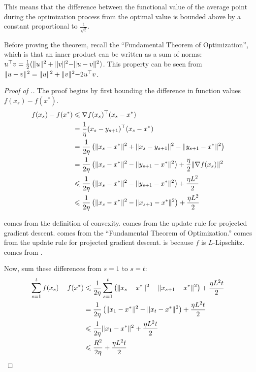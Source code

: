 This means that the difference between the functional value of the average
point during the optimization process from the optimal value is bounded above
by a constant proportional to $\frac{1}{\sqrt{t}}$.

Before proving the theorem, recall the ``Fundamental Theorem of Optimization'',
which is that an inner product can be written as a sum of norms: $u^\top v =
\frac{1}{2}(\lVert u \rVert^2 + \lVert v \lVert^2 - \lVert u - v \rVert^2)$.
This property can be seen from $\lVert u - v \rVert^2 = \lVert u \rVert^2 + \lVert v \lVert^2 - 2 u^\top v$.

\begin{proof}[Proof of .]
The proof begins by first bounding the difference in function values $f(x_s) -
f(x^*)$.
%
\begin{align}
    f(x_s) - f(x^*) &\leq \nabla f(x_s)^\trans (x_s - x^*) \equationlabel{a} \\
    &= \frac{1}{\eta}(x_s - y_{s+1})^\trans(x_s - x^*) \equationlabel{b} \\
    &= \frac{1}{2\eta} \left(\lVert x_s - x^* \rVert^2 + \lVert x_s - y_{s+1} \rVert^2 - \lVert y_{s+1} - x^* \rVert^2 \right) \equationlabel{c} \\
    &= \frac{1}{2\eta} \left(\lVert x_s - x^* \rVert^2 - \lVert y_{s+1} - x^* \rVert^2 \right) + \frac{\eta}{2} \lVert \nabla f(x_s) \rVert^2 \equationlabel{d} \\
    &\leq \frac{1}{2\eta} \left(\lVert x_s - x^* \rVert^2 - \lVert y_{s+1} - x^* \rVert^2 \right) + \frac{\eta L^2}{2} \equationlabel{e} \\
    &\leq \frac{1}{2\eta} \left(\lVert x_s - x^* \rVert^2 - \lVert x_{s+1} - x^* \rVert^2 \right) + \frac{\eta L^2}{2} \equationlabel{f}
\end{align}

 comes from the definition of convexity.  comes
from the update rule for projected gradient descent.  comes from
the ``Fundamental Theorem of Optimization.''  comes from the
update rule for projected gradient descent.  is because $f$ is
$L$-Lipschitz. 
comes from .

Now, sum these differences from $s=1$ to $s=t$:
\begin{align}
   \sum_{s=1}^t f(x_s) - f(x^*) &\leq  \frac{1}{2\eta} \sum_{s=1}^t \left(\lVert x_s - x^* \rVert^2 - \lVert x_{s+1} - x^* \rVert^2 \right) + \frac{\eta L^2 t}{2} \equationlabel{g} \\
   &= \frac{1}{2\eta} \left(\lVert x_1 - x^* \rVert^2 - \lVert x_{t} - x^{*} \rVert^2 \right) + \frac{\eta L^2 t}{2} \equationlabel{h} \\
   &\leq \frac{1}{2\eta} \lVert x_1 - x^* \rVert^2 + \frac{\eta L^2 t}{2} \equationlabel{i} \\
   &\leq \frac{R^2}{2\eta} + \frac{\eta L^2 t}{2} \equationlabel{j}
\end{align}


\end{proof}
